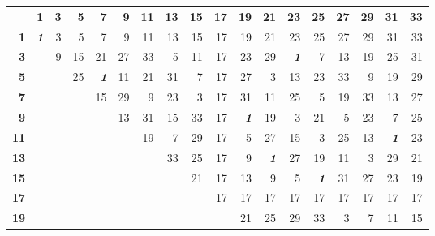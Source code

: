 \begin{tabular}{rllllllllrrrrrrrrr}

\multicolumn{1}{l}{\textbf{}} & \multicolumn{1}{r}{\textbf{1}} & \multicolumn{1}{r}{\textbf{3}} & \multicolumn{1}{r}{\textbf{5}} & \multicolumn{1}{r}{\textbf{7}} & \multicolumn{1}{r}{\textbf{9}} & \multicolumn{1}{r}{\textbf{11}} & \multicolumn{1}{r}{\textbf{13}} & \multicolumn{1}{r}{\textbf{15}} & \textbf{17} & \textbf{19} & \textbf{21} & \textbf{23} & \textbf{25} & \textbf{27} & \textbf{29} & \textbf{31} & \textbf{33} \\ 
\textbf{1} & \multicolumn{1}{r}{\textbf{\textit{1}}} & \multicolumn{1}{r}{3} & \multicolumn{1}{r}{5} & \multicolumn{1}{r}{7} & \multicolumn{1}{r}{9} & \multicolumn{1}{r}{11} & \multicolumn{1}{r}{13} & \multicolumn{1}{r}{15} & 17 & 19 & 21 & 23 & 25 & 27 & 29 & 31 & 33 \\ 
\textbf{3} &  & \multicolumn{1}{r}{9} & \multicolumn{1}{r}{15} & \multicolumn{1}{r}{21} & \multicolumn{1}{r}{27} & \multicolumn{1}{r}{33} & \multicolumn{1}{r}{5} & \multicolumn{1}{r}{11} & 17 & 23 & 29 & \textbf{\textit{1}} & 7 & 13 & 19 & 25 & 31 \\ 
\textbf{5} &  &  & \multicolumn{1}{r}{25} & \multicolumn{1}{r}{\textbf{\textit{1}}} & \multicolumn{1}{r}{11} & \multicolumn{1}{r}{21} & \multicolumn{1}{r}{31} & \multicolumn{1}{r}{7} & 17 & 27 & 3 & 13 & 23 & 33 & 9 & 19 & 29 \\ 
\textbf{7} &  &  &  & \multicolumn{1}{r}{15} & \multicolumn{1}{r}{29} & \multicolumn{1}{r}{9} & \multicolumn{1}{r}{23} & \multicolumn{1}{r}{3} & 17 & 31 & 11 & 25 & 5 & 19 & 33 & 13 & 27 \\ 
\textbf{9} &  &  &  &  & \multicolumn{1}{r}{13} & \multicolumn{1}{r}{31} & \multicolumn{1}{r}{15} & \multicolumn{1}{r}{33} & 17 & \textbf{\textit{1}} & 19 & 3 & 21 & 5 & 23 & 7 & 25 \\ 
\textbf{11} &  &  &  &  &  & \multicolumn{1}{r}{19} & \multicolumn{1}{r}{7} & \multicolumn{1}{r}{29} & 17 & 5 & 27 & 15 & 3 & 25 & 13 & \textbf{\textit{1}} & 23 \\ 
\textbf{13} &  &  &  &  &  &  & \multicolumn{1}{r}{33} & \multicolumn{1}{r}{25} & 17 & 9 & \textbf{\textit{1}} & 27 & 19 & 11 & 3 & 29 & 21 \\ 
\textbf{15} &  &  &  &  &  &  &  & \multicolumn{1}{r}{21} & 17 & 13 & 9 & 5 & \textbf{\textit{1}} & 31 & 27 & 23 & 19 \\ 
\textbf{17} &  &  &  &  &  &  &  &  & 17 & 17 & 17 & 17 & 17 & 17 & 17 & 17 & 17 \\ 
\textbf{19} &  &  &  &  &  &  &  &  & \multicolumn{1}{l}{} & 21 & 25 & 29 & 33 & 3 & 7 & 11 & 15 \\ 

\end{tabular}
